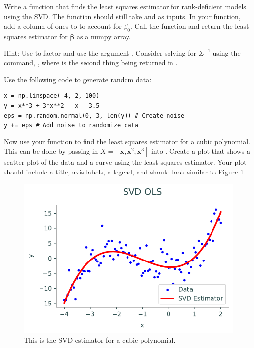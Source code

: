 \begin{problem}
Write a function that finds the least squares estimator for rank-deficient models using the SVD.
The function should still take  and  as inputs. In your function, add a column of ones to  to account for $\beta_0$. Call the function  and return the least squares estimator for $\boldsymbol\beta$ as a numpy array.

Hint: Use  to factor  and use the argument . Consider solving for $\Sigma^{-1}$ using the command, , where  is the second thing being returned in .
\end{problem}

\begin{problem}
Use the following code to generate random data:
\begin{lstlisting}
x = np.linspace(-4, 2, 100)
y = x**3 + 3*x**2 - x - 3.5
eps = np.random.normal(0, 3, len(y)) # Create noise
y += eps # Add noise to randomize data
\end{lstlisting}
Now use your function  to find the least squares estimator for a cubic polynomial.
This can be done by passing in $X=[\boldsymbol x, \boldsymbol x^2, \boldsymbol x^3]$ into .
Create a plot that shows a scatter plot of the data and a curve using the least squares estimator.
Your plot should include a title, axis labels, a legend, and should look similar to Figure \ref{fig:prob4}.
\end{problem}

\begin{figure}[H]
    \includegraphics[width=.7\textwidth]{figures/cubic_polynomial.pdf}
    \caption{This is the SVD estimator for a cubic polynomial.}
    \label{fig:prob4}
\end{figure}

%

